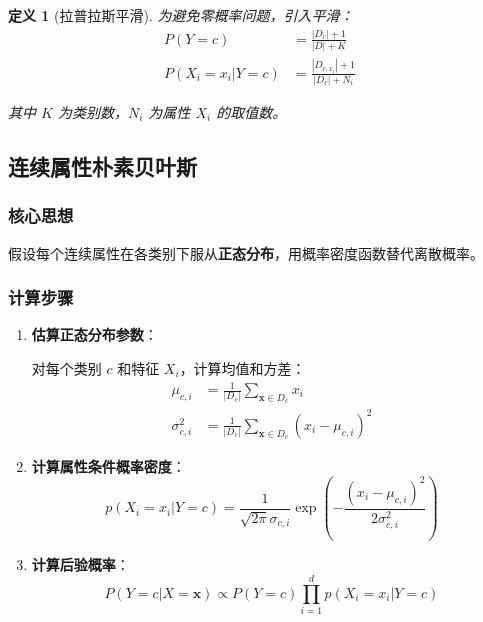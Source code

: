 \documentclass[12pt,a4paper]{ctexart}
\newtheorem{definition}{定义}[section]
\begin{document}
\begin{definition}[拉普拉斯平滑]
为避免零概率问题，引入平滑：
\begin{align}
P(Y=c) &= \frac{|D_c| + 1}{|D| + K} \\
P(X_i=x_i | Y=c) &= \frac{|D_{c,x_i}| + 1}{|D_c| + N_i}
\end{align}

其中 $K$ 为类别数，$N_i$ 为属性 $X_i$ 的取值数。
\end{definition}

\subsection{连续属性朴素贝叶斯}

\subsubsection{核心思想}

假设每个连续属性在各类别下服从\textbf{正态分布}，用概率密度函数替代离散概率。

\subsubsection{计算步骤}

\begin{enumerate}
    \item \textbf{估算正态分布参数}：
    
    对每个类别 $c$ 和特征 $X_i$，计算均值和方差：
    \begin{align}
    \mu_{c,i} &= \frac{1}{|D_c|}\sum_{\mathbf{x} \in D_c} x_i \\
    \sigma_{c,i}^2 &= \frac{1}{|D_c|}\sum_{\mathbf{x} \in D_c} (x_i - \mu_{c,i})^2
    \end{align}
    
    \item \textbf{计算属性条件概率密度}：
    \[
    p(X_i=x_i | Y=c) = \frac{1}{\sqrt{2\pi}\sigma_{c,i}} \exp\left(-\frac{(x_i - \mu_{c,i})^2}{2\sigma_{c,i}^2}\right)
    \]
    
    \item \textbf{计算后验概率}：
    \[
    P(Y=c | X=\mathbf{x}) \propto P(Y=c) \prod_{i=1}^{d} p(X_i=x_i | Y=c)
    \]
\end{enumerate}
\end{document}

